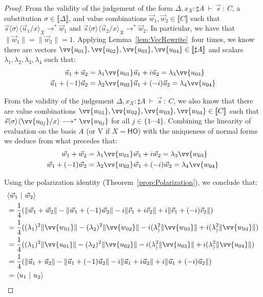 \documentclass[a4paper,UKenglish,numberwithinsect,pdfa,anonymous]{lipics-v2021}
\theoremstyle{restatestyle}
\newcommand\s[1]{\ensuremath{\mathsf{#1}}}
\newcommand\Val{{\s V}}
\newcommand\lra{\longrightarrow}
\newcommand\ansubst[2]{\ensuremath{\langle #1 \rangle_{#2}}}
\newcommand\AbsBasis{\ensuremath{\mathsf{H\!O}}}
\def\Val{\mathrm{V}}          %
\def\scal#1#2{\langle{#1}~|~{#2}\rangle}
\def\eval{\lra^*}
\def\sem#1{\llbracket#1\rrbracket}
\def\TYP#1#2#3{#1~{\vdash}~#2~{:}~#3}
\begin{document}
\begin{proof}
    From the validity of the judgement of the form $\TYP{\Delta, x_X:\sharp A}{\vec{s}}{C}$, a substitution $\sigma\in\sem{\Delta}$, and value combinations $\vec{w}_{1},\vec{w}_{2}\in\sem{C}$ such that $\vec{s}\ansubst{\sigma}{}\ansubst{\vec{u}_{1}/x}{X}\eval\vec{w}_{1}$ and $\vec{s}\ansubst{\sigma}{}\ansubst{\vec{u}_{2}/x}{X}\eval\vec{w}_{2}$. In particular, we have that $\|\vec{w}_{1}\| = \|\vec{w}_{2}\|=1$. Applying Lemma~\ref{lem:VecRewrite}~four times, we know there are vectors $\vv{u_{01}},\vv{u_{02}},\vv{u_{03}},\vv{u_{04}}\in\sem{\sharp A}$ and scalars $\lambda_1,\lambda_2,\lambda_3,\lambda_4$ such that:
    \begin{align*}
        \vec{u}_{1} + \vec{u}_{2} = \lambda_1 \vv{u_{01}} & \vec{u}_{1} + i \vec{u}_{2} = \lambda_3 \vv{u_{03}} \\
        \vec{u}_{1} + (-1) \vec{u}_{2} = \lambda_2 \vv{u_{02}} & \vec{u}_{1} + (-i) \vec{u}_{2} = \lambda_4 \vv{u_{04}} 
    \end{align*}

    From the validity of the judgement $\TYP{\Delta, x_X:\sharp A}{\vec{s}}{C}$, we also know that there are value combinations $\vv{w_{01}},\vv{w_{02}},\vv{w_{03}},\vv{w_{04}}\in\sem{C}$ such that $\vec{s}\ansubst{\sigma}{}\ansubst{\vv{u_{0j}}/x}{}\eval\vv{w_{0j}}$ for all $j\in\{1\dotsb 4\}$. Combining the linearity of evaluation on the basis $A$ (or $\Val$ if $X=\AbsBasis$) with the uniqueness of normal forms we deduce from what precedes that:
    \begin{align*}
        \vec{w}_{1} + \vec{w}_{2} = \lambda_1 \vv{w_{01}} & \vec{w}_{1} + i \vec{w}_{2} = \lambda_3 \vv{w_{03}} \\
        \vec{w}_{1} + (-1) \vec{w}_{2} = \lambda_2 \vv{w_{02}} & \vec{w}_{1} + (-i) \vec{w}_{2} = \lambda_4 \vv{w_{04}} 
    \end{align*}

    Using the polarization identity (Theorem~\ref{prop:Polarization}), we conclude that:
    \begin{align*}
        &\scal{\vec{w}_{1}}{\vec{w}_{2}}\\
        &= \frac{1}{4}(\|\vec{w}_{1}+\vec{w}_{2}\| - \|\vec{w}_{1} + (-1)\vec{w}_{2}\| - i \|\vec{v}_{1} + i \vec{v}_{2}\| + i \|\vec{v}_{1} + (-i) \vec{v}_{2}\|)\\
        &= \frac{1}{4}((\lambda_1)^2\|\vv{w_{01}}\| - (\lambda_2)^2\|\vv{w_{02}}\| - i (\lambda_)^2 \|\vv{w_{03}}\| + i (\lambda_)^2\|\vv{w_{04}}\|)\\
        &= \frac{1}{4}((\lambda_1)^2\|\vv{u_{01}}\| - (\lambda_2)^2\|\vv{u_{02}}\| - i (\lambda_)^2 \|\vv{u_{03}}\| + i (\lambda_)^2\|\vv{u_{04}}\|)\\
        &= \frac{1}{4}(\|\vec{u}_{1}+\vec{u}_{2}\| - \|\vec{u}_{1} + (-1)\vec{u}_{2}\| - i \|\vec{u}_{1} + i \vec{u}_{2}\| + i \|\vec{u}_{1} + (-i) \vec{u}_{2}\|)\\
        &=\scal{u_1}{u_2}
	\tag*{\qedhere}
    \end{align*}
\end{proof}
\end{document}
